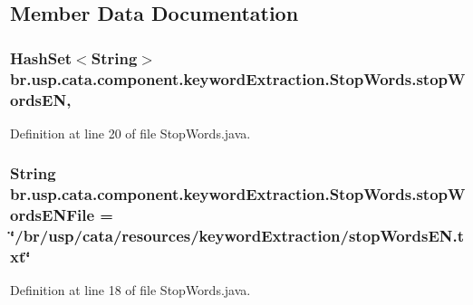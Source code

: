 \subsection{Member Data Documentation}
\hypertarget{classbr_1_1usp_1_1cata_1_1component_1_1keyword_extraction_1_1_stop_words_ab40186812209a954a47aa531fc92afd4}{
\subsubsection[{stop\+Words\+E\+N}]{\setlength{\rightskip}{0pt plus 5cm}Hash\+Set$<$String$>$ br.\+usp.\+cata.\+component.\+keyword\+Extraction.\+Stop\+Words.\+stop\+Words\+E\+N\hspace{0.3cm}{\ttfamily [static]}, {\ttfamily [private]}}}\label{classbr_1_1usp_1_1cata_1_1component_1_1keyword_extraction_1_1_stop_words_ab40186812209a954a47aa531fc92afd4}


Definition at line 20 of file Stop\+Words.\+java.

\hypertarget{classbr_1_1usp_1_1cata_1_1component_1_1keyword_extraction_1_1_stop_words_ae7faa48ee7bfeba3ae56fa605c3f64a1}{
\subsubsection[{stop\+Words\+E\+N\+File}]{\setlength{\rightskip}{0pt plus 5cm}String br.\+usp.\+cata.\+component.\+keyword\+Extraction.\+Stop\+Words.\+stop\+Words\+E\+N\+File = \char`\"{}/br/usp/cata/resources/keyword\+Extraction/stop\+Words\+E\+N.\+txt\char`\"{}\hspace{0.3cm}{\ttfamily [private]}}}\label{classbr_1_1usp_1_1cata_1_1component_1_1keyword_extraction_1_1_stop_words_ae7faa48ee7bfeba3ae56fa605c3f64a1}


Definition at line 18 of file Stop\+Words.\+java.

